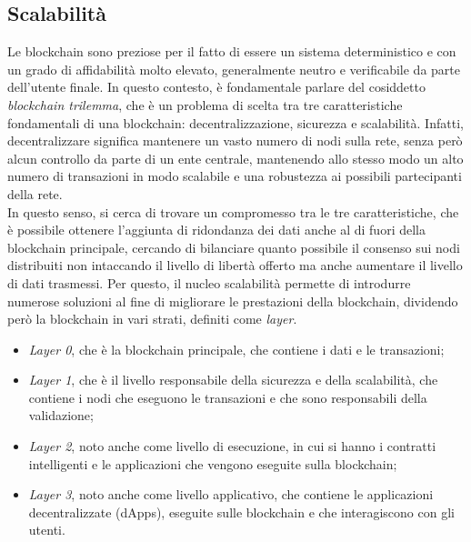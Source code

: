 \subsection{Scalabilità}\label{sec:tecnologie-blockchain-avanzate-scalabilita}
Le blockchain sono preziose per il fatto di essere un sistema deterministico e con un grado di affidabilità molto elevato, generalmente neutro e verificabile da parte dell'utente finale.
In questo contesto, è fondamentale parlare del cosiddetto \textit{blockchain trilemma}, che è un problema di scelta tra tre caratteristiche fondamentali di una blockchain: decentralizzazione, sicurezza e scalabilità.
Infatti, decentralizzare significa mantenere un vasto numero di nodi sulla rete, senza però alcun controllo da parte di un ente centrale, 
mantenendo allo stesso modo un alto numero di transazioni in modo scalabile e una robustezza ai possibili partecipanti della rete. \\

In questo senso, si cerca di trovare un compromesso tra le tre caratteristiche, che è possibile ottenere l'aggiunta di ridondanza dei dati anche al di fuori della blockchain principale,
cercando di bilanciare quanto possibile il consenso sui nodi distribuiti non intaccando il livello di libertà offerto ma anche aumentare il livello di dati trasmessi.
Per questo, il nucleo scalabilità permette di introdurre numerose soluzioni al fine di migliorare le prestazioni della blockchain, dividendo però la blockchain in vari strati, definiti come \textit{layer}.
\begin{itemize}
    \item{\textit{Layer 0}}, che è la blockchain principale, che contiene i dati e le transazioni;
    \item{\textit{Layer 1}}, che è il livello responsabile della sicurezza e della scalabilità, che contiene i nodi che eseguono le transazioni e che sono responsabili della validazione;
    \item{\textit{Layer 2}}, noto anche come livello di esecuzione, in cui si hanno i contratti intelligenti e le applicazioni che vengono eseguite sulla blockchain;
    \item{\textit{Layer 3}}, noto anche come livello applicativo, che contiene le applicazioni decentralizzate (dApps), eseguite sulle blockchain e che interagiscono con gli utenti.
\end{itemize}

